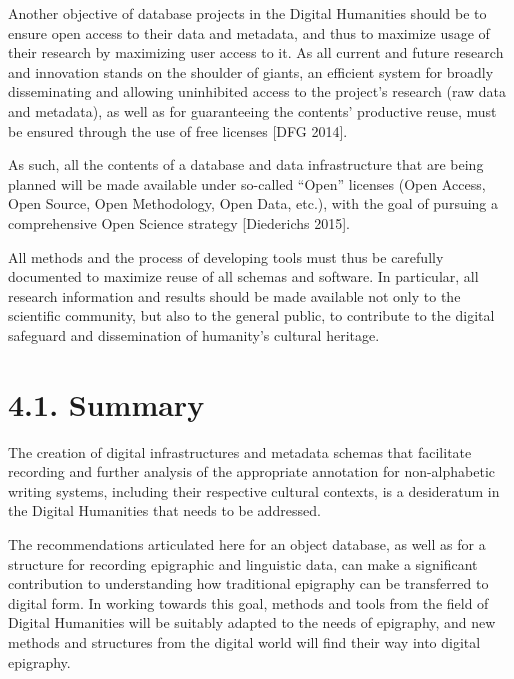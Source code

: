 \documentclass[amsthm,ebook]{saparticle}
\begin{document}
Another objective of database projects in the Digital Humanities should be to ensure open access to their data and
metadata, and thus to maximize usage of their research by maximizing user access to it. As all current and future
research and innovation stands on the shoulder of giants, an efficient system for broadly disseminating and allowing
uninhibited access to the project’s research (raw data and metadata), as well as for guaranteeing the contents’
productive reuse, must be ensured through the use of free licenses [DFG 2014]. 

As such, all the contents of a database and data infrastructure that are being planned will be made available under
so-called “Open” licenses (Open Access, Open Source, Open Methodology, Open Data, etc.), with the goal of pursuing a
comprehensive Open Science strategy [Diederichs 2015]. 

All methods and the process of developing tools must thus be carefully documented to maximize reuse of all schemas and
software. In particular, all research information and results should be made available not only to the scientific
community, but also to the general public, to contribute to the digital safeguard and dissemination of humanity’s
cultural heritage. 


\bigskip

\section[4.1. Summary ]{4.1. Summary }
The creation of digital infrastructures and metadata schemas that facilitate recording and further analysis of the
appropriate annotation for non-alphabetic writing systems, including their respective cultural contexts, is a
desideratum in the Digital Humanities that needs to be addressed.

The recommendations articulated here for an object database, as well as for a structure for recording epigraphic and
linguistic data, can make a significant contribution to understanding how traditional epigraphy can be transferred to
digital form. In working towards this goal, methods and tools from the field of Digital Humanities will be suitably
adapted to the needs of epigraphy, and new methods and structures from the digital world will find their way into
digital epigraphy. 


\bigskip



\bigskip



\end{document}
